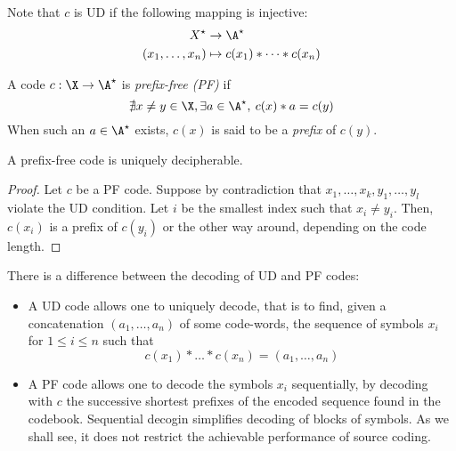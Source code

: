 \documentclass[toc]{../cs-classes/cs-classes}
\begin{document}
\begin{remark}
    Note that $c$ is UD if the following mapping is injective:
    \begin{equation*}
        \begin{aligned}
            X^\star&\to\A^\star\\
            (x_1, \dots, x_n)&\mapsto c(x_1) * \dots * c(x_n)
        \end{aligned}
    \end{equation*}
\end{remark}

\begin{definition}
    A code $c: \X\to\A^\star$ is \emph{prefix-free (PF)} if
    \begin{equation*}
        \nexists x\neq y\in \X, \exists a\in\A^\star,\: c(x)*a=c(y)
    \end{equation*} 
    When such an $a\in\A^\star$ exists, $c(x)$ is said to be a \emph{prefix} of $c(y)$.
\end{definition}

\begin{lemma}[PF$\implies$ UD]
    A prefix-free code is uniquely decipherable.
\end{lemma}

\begin{proof}
    Let $c$ be a PF code. Suppose by contradiction that $x_1, \dots, x_k, y_1, \dots, y_l$ violate the UD condition. Let $i$ be the smallest index such that $x_i\neq y_i$. Then, $c(x_i)$ is a prefix of $c(y_i)$ or the other way around, depending on the code length.
\end{proof}

\begin{remark}
    There is a difference between the decoding of UD and PF codes:
    \begin{itemize}
        \item A UD code allows one to uniquely decode, that is to find, given a concatenation $(a_1, \dots, a_n)$ of some code-words, the sequence of symbols $x_i$ for $1\leq i\leq n$ such that
        \begin{equation*}
            c(x_1)*\dots *c(x_n)=(a_1, \dots, a_n)
        \end{equation*} 
        \item A PF code allows one to decode the symbols $x_i$ sequentially, by decoding with $c$ the successive shortest prefixes of the encoded sequence found in the codebook. Sequential decogin simplifies decoding of blocks of symbols. As we shall see, it does not restrict the achievable performance of source coding.
    \end{itemize}
\end{remark}
\end{document}
